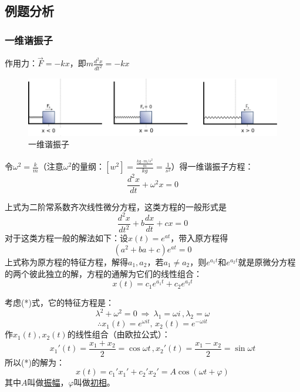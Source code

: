 \subsection{例题分析}
\subsubsection{一维谐振子}
作用力：$\vec{F}=-kx$，即$m\frac{d^2x}{dt^2}=-kx$
\begin{figure} [ht]
\centering
\includegraphics[scale=.5]{308px-Harmonic_oscillator.svg.png}
\caption{\simsun 一维谐振子}
\label{308px-Harmonic_oscillator.svg.png}
\end{figure}

令$\omega^2=\frac{k}{m}$（注意$\omega^2$的量纲：$[w^2]=\frac{\frac{kg\cdot m/s^2}{m}}{kg}=\frac{1}{s^2}$）得一维谐振子方程：
\[\frac{d^2x}{dt}+\omega^2x=0 \tag{*}\]

上式为二阶常系数齐次线性微分方程，这类方程的一般形式是
\[\frac{d^2x}{dt^2}+b\frac{dx}{dt}+cx=0\]
对于这类方程一般的解法如下：设$x(t)=e^{at}$，带入原方程得
\[(a^2+ba+c)e^{at}=0\]
上式称为原方程的特征方程，解得$a_1,a_2$，若$a_1\ne a_2$，则$e^{a_1t}$和$e^{a_2t}$就是原微分方程的两个彼此独立的解，方程的通解为它们的线性组合：
\[x(t)=c_1e^{a_1t}+c_2e^{a_2t}\]

考虑(*)式，它的特征方程是：
\[\lambda^2+\omega^2=0 \ \Rightarrow \  \lambda_1=\omega i\,, \lambda_2=\omega \]
\[ \therefore x_1(t)=e^{\omega i t},\,x_2(t)=e^{-\omega i t}\]
作$x_1(t),x_2(t)$的线性组合（由欧拉公式）：
\[x_1'(t)=\frac{x_1+x_2}{2}=\cos\omega t\,,x_2'(t)=\frac{x_1-x_2}{2}=\sin\omega t\]
所以(*)的解为：
\[x(t)=c_1'x_1'+c_2'x_2'=A\cos(\omega t+\varphi)\]
其中$A$叫做\underline{振幅}，$\varphi$叫做\underline{初相}。
